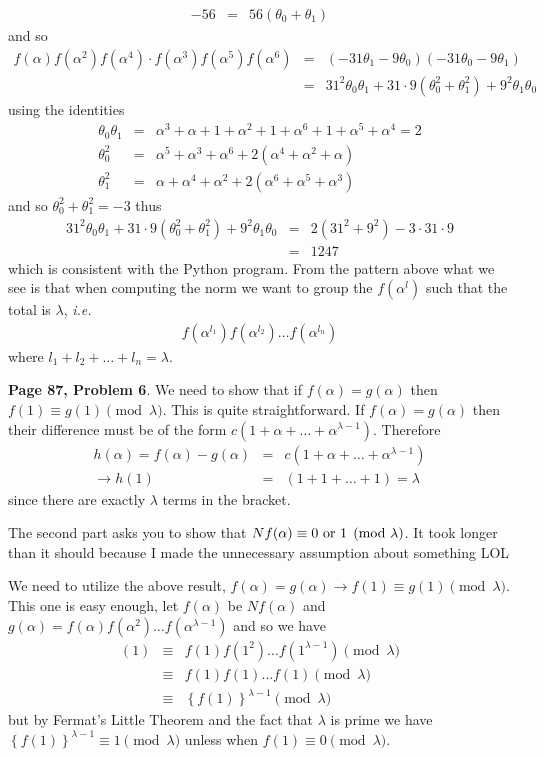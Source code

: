 \documentclass[aps,preprint,preprintnumbers,nofootinbib,showpacs,prd]{revtex4-1}
\newcommand{\ie}{{\it i.e.} }
\newcommand{\nbea}{\begin{eqnarray*}}
\newcommand{\neea}{\end{eqnarray*}}
\begin{document}
%
\nbea
-56 & = & 56(\theta_0 + \theta_1)
\neea
%
and so
%
\nbea
f(\alpha)f(\alpha^2)f(\alpha^4)\cdot f(\alpha^3)f(\alpha^5)f(\alpha^6) & = & (-31\theta_1 -9\theta_0)(-31\theta_0 - 9\theta_1) \\
& = & 31^2\theta_0\theta_1 + 31\cdot9 (\theta_0^2 + \theta_1^2) + 9^2\theta_1\theta_0
\neea
%
using the identities
%
\nbea
\theta_0\theta_1 & = & \alpha^3 + \alpha + 1 + \alpha^2 + 1 + \alpha^6 + 1 + \alpha^5 + \alpha^4 = 2 \\
\theta_0^2 & = & \alpha^5 + \alpha^3 + \alpha^6 + 2(\alpha^4 + \alpha^2 + \alpha) \\
\theta_1^2 & = & \alpha + \alpha^4 + \alpha^2 + 2(\alpha^6 + \alpha^5 + \alpha^3)
\neea
%
and so $\theta_0^2 + \theta_1^2 = -3$ thus
%
\nbea
31^2\theta_0\theta_1 + 31\cdot9 (\theta_0^2 + \theta_1^2) + 9^2\theta_1\theta_0 & = & 2(31^2 + 9^2) - 3\cdot31\cdot 9 \\
& = & 1247
\neea
%
which is consistent with the Python program. From the pattern above what we see is that when computing the norm we want to group the $f(\alpha^l)$ such that the total is $\lambda$, \ie
%
\nbea
f(\alpha^{l_1}) f(\alpha^{l_2}) \dots f(\alpha^{l_n})
\neea
%
where $l_1 + l_2 + \dots + l_n = \lambda$.

{\bf Page 87, Problem 6}. We need to show that if $f(\alpha) = g(\alpha)$ then $f(1) \equiv g(1) \pmod{\lambda}$. This is quite straightforward. If $f(\alpha) = g(\alpha)$ then their difference must be of the form $c(1 + \alpha + \dots + \alpha^{\lambda-1})$. Therefore
%
\nbea
h(\alpha) = f(\alpha) - g(\alpha) & = & c(1 + \alpha + \dots + \alpha^{\lambda-1}) \\
\to h(1) & = & (1 + 1 + \dots + 1) = \lambda
\neea
%
since there are exactly $\lambda$ terms in the bracket.

The second part asks you to show that $Nf(\alpha) \equiv 0 {\rm~or~} 1 \pmod{\lambda}$. It took longer than it should because I made the unnecessary assumption about something LOL

We need to utilize the above result, $f(\alpha) = g(\alpha) \to f(1) \equiv g(1) \pmod{\lambda}$. This one is easy enough, let $f(\alpha)$ be $Nf(\alpha)$ and $g(\alpha) = f(\alpha)f(\alpha^2)\dots f(\alpha^{\lambda-1})$ and so we have
%
\nbea
[Nf](1) & \equiv & f(1)f(1^2)\dots f(1^{\lambda-1}) \pmod{\lambda} \\
& \equiv & f(1)f(1)\dots f(1) \pmod{\lambda} \\
& \equiv & \left \{f(1)\right\}^{\lambda-1} \pmod{\lambda}
\neea
%
but by Fermat's Little Theorem and the fact that $\lambda$ is prime we have $\left \{f(1)\right\}^{\lambda-1} \equiv 1 \pmod{\lambda}$ unless when $f(1) \equiv 0 \pmod{\lambda}$.
\end{document}
